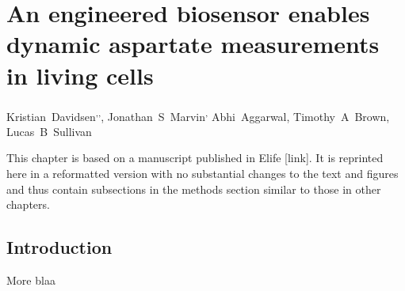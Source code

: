 \chapter{An engineered biosensor enables dynamic aspartate measurements in living cells}

\renewcommand{\thefootnote}{\fnsymbol{footnote}}
\begin{center}
    \mbox{Kristian Davidsen\footnotemark[1]\textsuperscript{,}\footnotemark[2]\textsuperscript{,}\footnotemark[4],}
    \mbox{Jonathan S Marvin\footnotemark[3]\textsuperscript{,}\footnotemark[4]\footnotemark[5]}
    \mbox{Abhi Aggarwal\footnotemark[3],}
    \mbox{Timothy A Brown\footnotemark[3],}
    \mbox{Lucas B Sullivan\footnotemark[1]\footnotemark[5]}
\end{center}

\setcounter{footnote}{0}
\renewcommand{\thefootnote}{\arabic{footnote}}




This chapter is based on a manuscript published in Elife [link].
It is reprinted here in a reformatted version with no substantial changes to the text and figures and thus contain subsections in the methods section similar to those in other chapters.







\section{Introduction}
More blaa